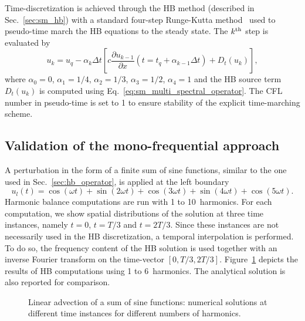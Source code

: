 Time-discretization is achieved 
through the HB method (described in Sec.~\ref{sec:sm_hb})
with a standard four-step Runge-Kutta method~\cite{Jameson1981}
used to pseudo-time 
march the HB equations to the steady state.
The $k\textsuperscript{th}$ step is evaluated by
\begin{equation}
    u_k = u_q - \alpha_k \Delta t \left [ 
          c \frac{\partial u_{k-1}}{\partial x} (t=t_q + \alpha_{k-1} \Delta t)
          + D_t(u_k)
          \right],
    \label{eq:convection_rk4}
\end{equation}
where $\alpha_0 = 0$, $\alpha_1 = 1/4$, 
$\alpha_2 = 1/3$, $\alpha_3 = 1/2$, $\alpha_4 = 1$ and 
the HB source term $D_t(u_k)$ is computed using Eq.~\eqref{eq:sm_multi_spectral_operator}.
The CFL number in pseudo-time is set to 1 
to ensure stability of the explicit time-marching scheme.

\subsection{Validation of the mono-frequential approach}
\label{sec:sum_sine}

A perturbation 
in the form of a finite sum of sine functions, similar to the one used
in Sec.~\ref{sec:hb_operator},
is applied at the left boundary
\begin{equation}
    u_l(t) = \cos(\omega t) + \sin(2 \omega t) +
    \cos(3 \omega t) + \sin(4 \omega t) + \cos(5 \omega t).
    \label{eq:sum_injected_fct}
\end{equation}
Harmonic balance computations are run with 1 to 10~harmonics.
For each computation, we show spatial distributions of the solution
at three time instances, namely $t=0$, $t=T/3$ and $t=2T/3$.
Since these instances are not necessarily used in the HB discretization,
a temporal interpolation is performed.
To do so, the frequency content of the HB solution is used
together with an inverse Fourier transform on the time-vector
$[0, T/3, 2T/3]$.
Figure~\ref{fig:inj_sine_results} depicts the results of HB computations
using 1 to 6~harmonics. The analytical solution is also reported for comparison.

\begin{figure}[htp]
  \centering
  \caption{Linear advection of a sum of sine functions: 
  numerical solutions at different time instances for different numbers of harmonics.}
  \label{fig:inj_sine_results}
\end{figure}

